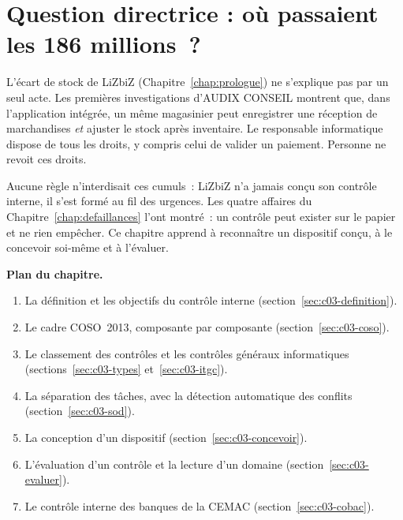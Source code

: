 \bigskip

\section*{Question directrice : où passaient les 186 millions~?}

L'écart de stock de LiZbiZ (Chapitre~\ref{chap:prologue}) ne s'explique
pas par un seul acte. Les premières investigations d'AUDIX CONSEIL montrent
que, dans l'application intégrée, un même magasinier peut enregistrer une
réception de marchandises \emph{et} ajuster le stock après inventaire. Le
responsable informatique dispose de tous les droits, y compris celui de
valider un paiement. Personne ne revoit ces droits.

Aucune règle n'interdisait ces cumuls~: LiZbiZ n'a jamais conçu son
contrôle interne, il s'est formé au fil des urgences. Les quatre affaires du
Chapitre~\ref{chap:defaillances} l'ont montré~: un contrôle peut exister
sur le papier et ne rien empêcher. Ce chapitre apprend à reconnaître un
dispositif conçu, à le concevoir soi-même et à l'évaluer.

\medskip
\textbf{Plan du chapitre.}
\begin{enumerate}
    \item La définition et les objectifs du contrôle interne
          (section~\ref{sec:c03-definition}).
    \item Le cadre COSO~2013, composante par composante
          (section~\ref{sec:c03-coso}).
    \item Le classement des contrôles et les contrôles généraux
          informatiques (sections~\ref{sec:c03-types}
          et~\ref{sec:c03-itgc}).
    \item La séparation des tâches, avec la détection automatique des
          conflits (section~\ref{sec:c03-sod}).
    \item La conception d'un dispositif (section~\ref{sec:c03-concevoir}).
    \item L'évaluation d'un contrôle et la lecture d'un domaine
          (section~\ref{sec:c03-evaluer}).
    \item Le contrôle interne des banques de la CEMAC
          (section~\ref{sec:c03-cobac}).
\end{enumerate}

\separateur

